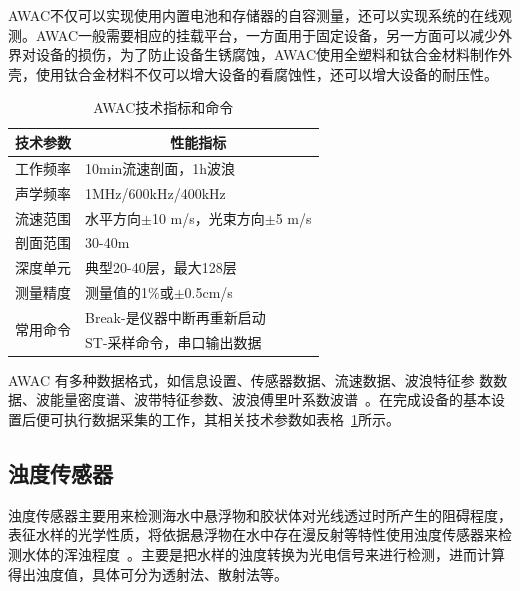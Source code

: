AWAC不仅可以实现使用内置电池和存储器的自容测量，还可以实现系统的在线观测。AWAC一般需要相应的挂载平台，一方面用于固定设备，另一方面可以减少外界对设备的损伤，为了防止设备生锈腐蚀，AWAC使用全塑料和钛合金材料制作外壳，使用钛合金材料不仅可以增大设备的看腐蚀性，还可以增大设备的耐压性。

\begin{table}[htb]
  \centering\small
  \caption{AWAC技术指标和命令}
  \label{tab:AWAC}
\begin{tabular}{|c|c|c|}
\hline
\multicolumn{2}{|c|}{\bf 技术参数}                  &{\bf 性能指标 }                        \\ \hline
\multicolumn{2}{|l|}{工作频率}                  & \multicolumn{1}{l|}{10min流速剖面，1h波浪}                \\ \hline
\multicolumn{2}{|l|}{声学频率}                  & \multicolumn{1}{l|}{1MHz/600kHz/400kHz}                \\ \hline
\multicolumn{2}{|l|}{流速范围}                  & \multicolumn{1}{l|}{水平方向$\pm$10 m/s，光束方向$\pm$5 m/s}                         \\ \hline
\multicolumn{2}{|l|}{剖面范围}                  & \multicolumn{1}{l|}{30-40m}                     \\ \hline
\multicolumn{2}{|l|}{深度单元}                  & \multicolumn{1}{l|}{典型20-40层，最大128层}                       \\ \hline
\multicolumn{2}{|l|}{测量精度}                  & \multicolumn{1}{l|}{测量值的1\%或$\pm$0.5cm/s}                        \\ \hline
\multicolumn{2}{|c|}{\multirow{2}{*}{常用命令}} & \multicolumn{1}{l|}{Break-是仪器中断再重新启动}     \\ \cline{3-3} 
\multicolumn{2}{|l|}{}                          & \multicolumn{1}{l|}{ST-采样命令，串口输出数据} \\ \hline
\end{tabular}
\end{table}

AWAC 有多种数据格式，如信息设置、传感器数据、流速数据、波浪特征参 数数据、波能量密度谱、波带特征参数、波浪傅里叶系数波谱~\cite{2014wjs}。在完成设备的基本设置后便可执行数据采集的工作，其相关技术参数如表格~\ref{tab:AWAC}所示。

\subsection{浊度传感器}
浊度传感器主要用来检测海水中悬浮物和胶状体对光线透过时所产生的阻碍程度，表征水样的光学性质，将依据悬浮物在水中存在漫反射等特性使用浊度传感器来检测水体的浑浊程度~\cite{2015wj}。主要是把水样的浊度转换为光电信号来进行检测，进而计算得出浊度值，具体可分为透射法、散射法等。

